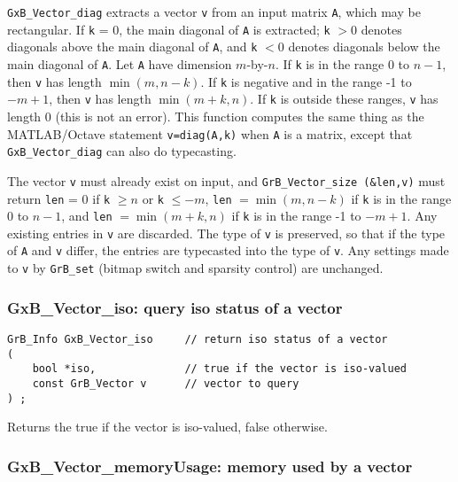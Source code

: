 \documentclass[12pt]{article}
\begin{document}
\verb'GxB_Vector_diag' extracts a vector \verb'v' from an input matrix
\verb'A', which may be rectangular.  If \verb'k' = 0, the main diagonal of
\verb'A' is extracted; \verb'k' $> 0$ denotes diagonals above the main diagonal
of \verb'A', and \verb'k' $< 0$ denotes diagonals below the main diagonal of
\verb'A'.  Let \verb'A' have dimension $m$-by-$n$.  If \verb'k' is in the range
0 to $n-1$, then \verb'v' has length $\min(m,n-k)$.  If \verb'k' is negative
and in the range -1 to $-m+1$, then \verb'v' has length $\min(m+k,n)$.  If
\verb'k' is outside these ranges, \verb'v' has length 0 (this is not an error).
This function computes the same thing as the MATLAB/Octave statement
\verb'v=diag(A,k)' when \verb'A' is a matrix, except that
\verb'GxB_Vector_diag' can also do typecasting.

The vector \verb'v' must already exist on input, and
\verb'GrB_Vector_size (&len,v)' must return \verb'len' = 0 if \verb'k' $\ge n$
or \verb'k' $\le -m$, \verb'len' $=\min(m,n-k)$ if \verb'k' is in the range 0
to $n-1$, and \verb'len' $=\min(m+k,n)$ if \verb'k' is in the range -1 to
$-m+1$.  Any existing entries in \verb'v' are discarded.  The type of \verb'v'
is preserved, so that if the type of \verb'A' and \verb'v' differ, the entries
are typecasted into the type of \verb'v'.  Any settings made to \verb'v' by
\verb'GrB_set' (bitmap switch and sparsity control) are
unchanged.

\newpage
\subsubsection{{\sf GxB\_Vector\_iso:} query iso status of a vector}
\label{vector_iso}

\begin{mdframed}[userdefinedwidth=6in]
{\footnotesize
\begin{verbatim}
GrB_Info GxB_Vector_iso     // return iso status of a vector
(
    bool *iso,              // true if the vector is iso-valued
    const GrB_Vector v      // vector to query
) ;
\end{verbatim} } \end{mdframed}

Returns the true if the vector is iso-valued, false otherwise.

\subsubsection{{\sf GxB\_Vector\_memoryUsage:} memory used by a vector}
\label{vector_memusage}
\end{document}
